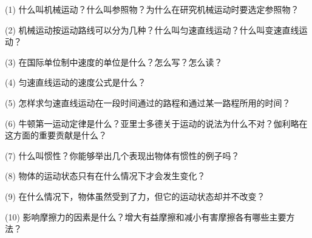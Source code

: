 \label{sec:3-fuxi}

(1) 什么叫机械运动？什么叫参照物？为什么在研究机械运动时要选定参照物？

(2) 机械运动按运动路线可以分为几种？什么叫匀速直线运动？什么叫变速直线运动？

(3) 在国际单位制中速度的单位是什么？怎么写？怎么读？

(4) 匀速直线运动的速度公式是什么？

(5) 怎样求匀速直线运动在一段时间通过的路程和通过某一路程所用的时间？

(6) 牛顿第一运动定律是什么？亚里士多德关于运动的说法为什么不对？伽利略在这方面的重要贡献是什么？

(7) 什么叫惯性？你能够举出几个表现出物体有惯性的例子吗？

(8) 物体的运动状态只有在什么情况下才会发生变化？

(9) 在什么情况下，物体虽然受到了力，但它的运动状态却并不改变？

(10) 影响摩擦力的因素是什么？增大有益摩擦和减小有害摩擦各有哪些主要方法？

